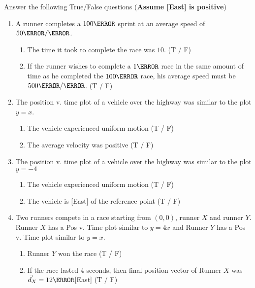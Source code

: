 \documentclass[12pt]{article} %
\begin{document}
\begin{qstn}[1] %
    Answer the following True/False questions (\textbf{Assume [East] is positive})
    \begin{enumerate}
        \item A runner completes a $100\m$ sprint at an average speed of $50 \m / \s$.
        \begin{enumerate}[label = (\alph*)]
            \item The time it took to complete the race was $10$\s. (T / F)
            \item If the runner wishes to complete a $1\km$ race in the same amount of time as he completed the $100\m$ race, his average speed must be $500 \m / \s$. (T / F)
        \end{enumerate}
        \item The position v. time plot of a vehicle over the highway was similar to the plot $y = x$.
        \begin{enumerate}[label = (\alph*)]
            \item The vehicle experienced uniform motion (T / F)
            \item The average velocity was positive (T / F)
        \end{enumerate}
        \item The position v. time plot of a vehicle over the highway was similar to the plot $y = -4$
        \begin{enumerate}[label = (\alph*)]
            \item The vehicle experienced uniform motion (T / F)
            \item The vehicle is [East] of the reference point (T / F)
        \end{enumerate}
        \item Two runners compete in a race starting from $(0,0)$, runner $X$ and runner $Y$. Runner $X$ has a Pos v. Time plot similar to $y = 4x$ and Runner $Y$ has a Pos v. Time plot similar to $y = x$.
        \begin{enumerate}[label = (\alph*)]
            \item Runner $Y$ won the race (T / F)
            \item If the race lasted $4$ seconds, then final position vector of Runner $X$ was $\vec d_X = 12\m$[East] (T / F)
        \end{enumerate}

    \end{enumerate}

 \end{qstn}
\end{document}
